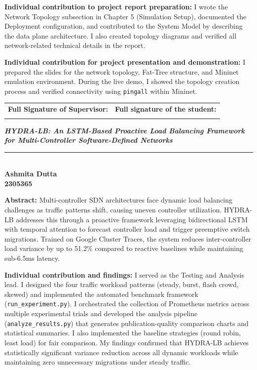 \documentclass[12pt,a4paper]{report}
\newcommand{\ProjectTitle}{HYDRA-LB: An LSTM-Based Proactive Load Balancing Framework for Multi-Controller Software-Defined Networks}
\begin{document}
\vspace{0.5cm}
\noindent\textbf{Individual contribution to project report preparation:} I wrote the Network Topology subsection in Chapter 5 (Simulation Setup), documented the Deployment configuration, and contributed to the System Model by describing the data plane architecture. I also created topology diagrams and verified all network-related technical details in the report.

\vspace{0.5cm}
\noindent\textbf{Individual contribution for project presentation and demonstration:} I prepared the slides for the network topology, Fat-Tree structure, and Mininet emulation environment. During the live demo, I showed the topology creation process and verified connectivity using \texttt{pingall} within Mininet.

\vspace{1.5cm}
\noindent\begin{tabular}{p{7cm}p{7cm}}
\textbf{Full Signature of Supervisor:} & \textbf{Full signature of the student:} \\
\dotfill & \dotfill \\
\end{tabular}

\newpage
\thispagestyle{fancy}
\begin{center}
{\large \textbf{\textit{\ProjectTitle}}}\\
\rule{\textwidth}{0.4pt}\\[1cm]

{\Large \textbf{Ashmita Dutta}}\\
{\large \textbf{2305365}}\\[0.8cm]
\end{center}

\noindent\textbf{Abstract:} Multi-controller SDN architectures face dynamic load balancing challenges as traffic patterns shift, causing uneven controller utilization. HYDRA-LB addresses this through a proactive framework leveraging bidirectional LSTM with temporal attention to forecast controller load and trigger preemptive switch migrations. Trained on Google Cluster Traces, the system reduces inter-controller load variance by up to 51.2\% compared to reactive baselines while maintaining sub-6.5ms latency.

\vspace{0.5cm}
\noindent\textbf{Individual contribution and findings:} I served as the Testing and Analysis lead. I designed the four traffic workload patterns (steady, burst, flash crowd, skewed) and implemented the automated benchmark framework (\texttt{run\_experiment.py}). I orchestrated the collection of Prometheus metrics across multiple experimental trials and developed the analysis pipeline (\texttt{analyze\_results.py}) that generates publication-quality comparison charts and statistical summaries. I also implemented the baseline strategies (round robin, least load) for fair comparison. My findings confirmed that HYDRA-LB achieves statistically significant variance reduction across all dynamic workloads while maintaining zero unnecessary migrations under steady traffic.
\end{document}
